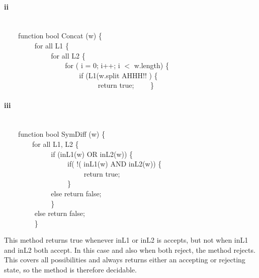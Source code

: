 \documentclass[10pt,letter]{article}
\begin{document}
\paragraph{ii}
\ \\
{\selectfont
$\qquad$function bool Concat (w)  \{  \\
$\qquad$$\qquad$	for all L1 \{ \\
$\qquad$$\qquad$ $\qquad$ for all L2 \{ \\
$\qquad$$\qquad$$\qquad$ $\qquad$ for ( i = 0; i++; i $<$ w.length) \{ \\	
$\qquad$$\qquad$$\qquad$ $\qquad$ $\qquad$if (L1(w.split AHHH!! ) \{ \\
$\qquad$$\qquad$$\qquad$ $\qquad$ $\qquad$ $\qquad$ return true;
$\qquad$\}}

\paragraph{iii}
\ \\
{\selectfont
$\qquad$function bool SymDiff (w) \{  \\
$\qquad$$\qquad$for all L1, L2 \{\\
$\qquad$$\qquad$ $\qquad$ if (inL1(w) OR inL2(w)) \{ \\
$\qquad$$\qquad$ $\qquad$ $\qquad$ if( !( inL1(w) AND inL2(w))  \{ \\
$\qquad$$\qquad$ $\qquad$ $\qquad$ $\qquad$ return true; \\
$\qquad$$\qquad$ $\qquad$ $\qquad$			\} \\
$\qquad$$\qquad$ $\qquad$ 		else return false; \\
$\qquad$$\qquad$	$\qquad$	\} \\
$\qquad$$\qquad$	else	return false; \\
$\qquad$$\qquad$ \} \\}

This method returns true whenever inL1 or inL2 is accepts, but not when inL1 and inL2 both accept. In this case and also when both reject, the method rejects. This covers all possibilities and always returns either an accepting or rejecting state, so the method is therefore decidable. 
			
\end{document}
